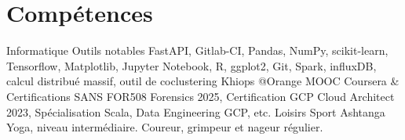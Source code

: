 \documentclass[]{friggeri-cv}
\begin{document}
\section{Compétences}
\vspace{-0.5em}

\begin{entrylist}
 \entry
 {Informatique}
 {Outils notables}
 {}
 {FastAPI, Gitlab-CI, Pandas, NumPy, scikit-learn, Tensorflow, Matplotlib, Jupyter Notebook, R, ggplot2, Git, Spark, influxDB, calcul distribué massif, outil de coclustering Khiops @Orange}
 \entry
 {}
 {MOOC Coursera \& Certifications}
 {}
 {SANS FOR508 Forensics 2025, Certification GCP Cloud Architect 2023, Spécialisation Scala, Data Engineering GCP, etc.}
 \entry
 {Loisirs}
 {Sport}
 {}
 {Ashtanga Yoga, niveau intermédiaire. Coureur, grimpeur et nageur régulier.}
 \vspace{-2.5em}

\end{entrylist}
\end{document}
